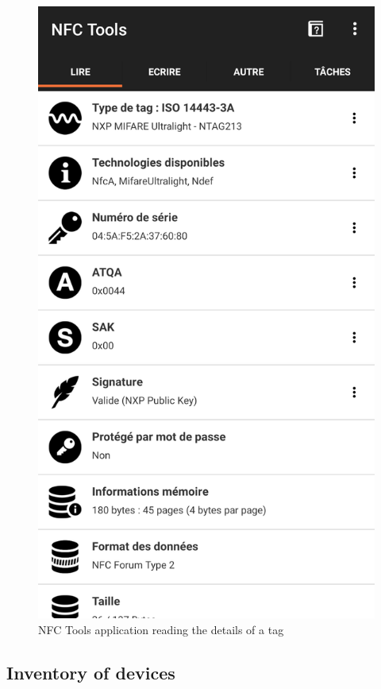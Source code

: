 \begin{figure}[htp!]
  \centering
  \includegraphics[scale=0.2]{figures/data_NFC-Tools.png}
  \caption{NFC Tools application reading the details of a tag}
  \label{fig:nfc-tools}
\end{figure}

\newpage
\subsection{Inventory of devices}

